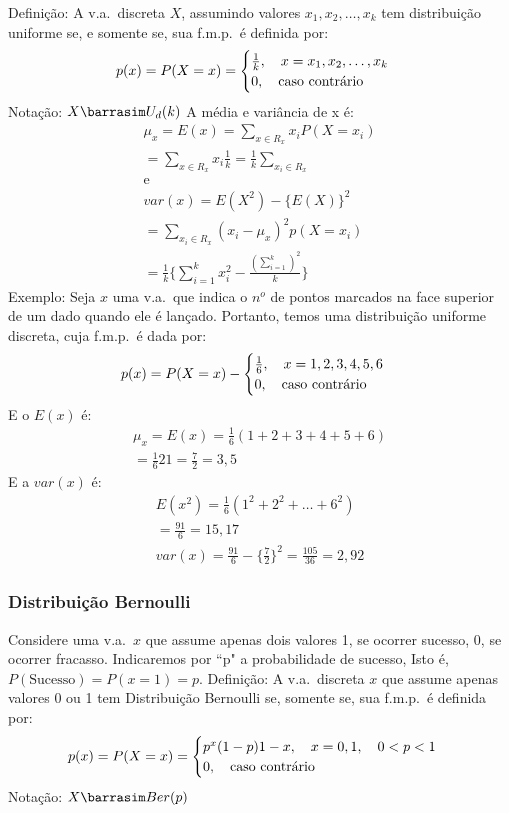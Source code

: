 \documentclass[11pt,a4paper]{book}
\begin{document}
\begin{enumerate}[label=(\alph*)]
\begin{enumerate}
Definição: A v.a.\ discreta $X$, assumindo valores $x_1,x_2,\dots,x_k$ tem 
distribuição uniforme se, e somente se, sua f.m.p.\ é definida por: 
\begin{align}
  p(x)=P(X=x)=\begin{cases}
    \frac{1}{k}, \text{\quad} x=x_1,x_2,\dots,x_k\\
    0, \text{\quad caso contrário}
  \end{cases}
\end{align}
Notação: $X \barrasim U_{d}(k)$
A média e variância de x é:
\begin{align}
  \mu_{x}=E(x)=\sum_{x \in R_{x}}x_i P(X=x_i)\\
  = \sum_{x \in R_{x}}x_i \frac{1}{k}= \frac{1}{k}\sum_{x_i \in R_{x}}\\
  \text{e}\\
  var(x)=E(X^2)-\{E(X)\}^2\\
  = \sum_{x_i \in R_{x}}(x_i -\mu_x )^2 p(X=x_i)\\
  =\frac{1}{k} \{\sum^k_{i=1} x_i^2 - \frac{(\sum_{i=1}^k)^2}{k}\}
\end{align}
Exemplo: Seja $x$ uma v.a.\ que indica o $n^o$ de pontos marcados na face 
superior de um dado quando ele é lançado. Portanto, temos uma distribuição 
uniforme discreta, cuja f.m.p.\ é dada por: 
\begin{align}
  p(x)=P(X=x)-\begin{cases}
    \frac{1}{6},\text{\quad} x=1,2,3,4,5,6\\
    0, \text{\quad caso contrário}
  \end{cases}
\end{align}
E o $E(x)$ é: 
\begin{align}
  \mu_{x}=E(x)=\frac{1}{6}(1+2+3+4+5+6)\\
  =\frac{1}{6}21= \frac{7}{2}=3,5
\end{align}
E a $var(x)$ é:
\begin{align}
  E(x^2)=\frac{1}{6}(1^2 + 2^2 + \dots + 6^2)\\
  =\frac{91}{6}=15,17\\
  var(x)=\frac{91}{6}- \{\frac{7}{2}\}^2=\frac{105}{36}=2,92
\end{align}
\subsubsection{Distribuição Bernoulli}
Considere uma v.a.\ $x$ que assume apenas dois valores 1, se ocorrer sucesso,
0, se ocorrer fracasso. Indicaremos por ``p" a probabilidade de sucesso, Isto
é, $P(\text{Sucesso})=P(x=1)=p$.
Definição: A v.a.\ discreta $x$ que assume apenas valores 0 ou 1 tem Distribuição
Bernoulli se, somente se, sua f.m.p.\ é definida por:
\begin{align}
  p(x)=P(X=x)= \begin{cases}
    p^{x}(1-p){1-x}, \text{\quad} x=0,1, \text{\quad} 0<p<1\\
    0, \text{\quad caso contrário}
  \end{cases}
\end{align}
Notação: $X \barrasim Ber(p)$


\end{enumerate}
\end{enumerate}
\end{document}
